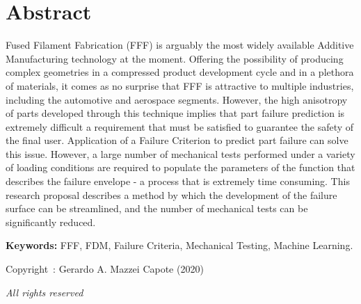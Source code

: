 \documentclass[main.tex]{subfiles}
\begin{document}
\setcounter{page}{1}
\chapter*{Abstract}
Fused Filament Fabrication (FFF) is arguably the most widely available Additive Manufacturing technology at the moment. Offering the possibility of producing complex geometries in a compressed product development cycle and in a plethora of materials, it comes as no surprise that FFF is attractive to multiple industries, including the automotive and aerospace segments. However, the high anisotropy of parts developed through this technique implies that part failure prediction is extremely difficult \textemdash a requirement that must be satisfied to guarantee the safety of the final user. Application of a Failure Criterion to predict part failure can solve this issue. However, a large number of mechanical tests performed under a variety of loading conditions are required to populate the parameters of the function that describes the failure envelope - a process that is extremely time consuming. This research proposal describes a method by which the development of the failure surface can be streamlined, and the number of mechanical tests can be significantly reduced. 
 
\vspace{10mm} %
\textbf{Keywords:} FFF, FDM, Failure Criteria, Mechanical Testing, Machine Learning.

\vfill %
\begin{center}
Copyright~\textcopyright: Gerardo A. Mazzei Capote (2020)

\emph{All rights reserved}	
\end{center}
\end{document}
